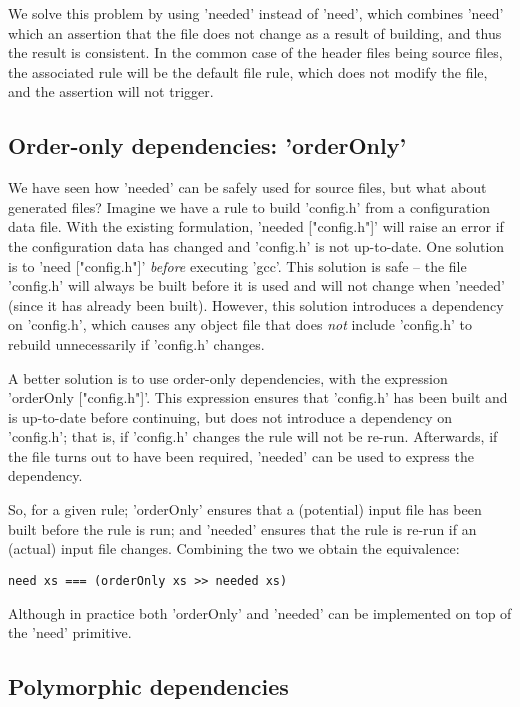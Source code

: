 We solve this problem by using \lst'needed' instead of \lst'need', which
combines \lst'need' which an assertion that the file does not change as a result
of building, and thus the result is consistent. In the common case of the header
files being source files, the associated rule will be the default file rule,
which does not modify the file, and the assertion will not trigger.

\subsection{Order-only dependencies: \lst'orderOnly'}

We have seen how \lst'needed' can be safely used for source files, but what
about generated files? Imagine we have a rule to build \lst'config.h' from a
configuration data file. With the existing formulation,
\lst'needed ["config.h"]' will raise an error if the configuration data has
changed and \lst'config.h' is not up-to-date. One solution is to \lst'need ["config.h"]'
\emph{before} executing \lst'gcc'. This solution is safe -- the file
\lst'config.h' will always be built before it is used and will not change when
\lst'needed' (since it has already been built). However, this solution
introduces a dependency on \lst'config.h', which causes any object file that
does \emph{not} include \lst'config.h' to rebuild unnecessarily if
\lst'config.h' changes.

A better solution is to use order-only dependencies, with the expression
\lst'orderOnly ["config.h"]'. This expression ensures that \lst'config.h' has
been built and is up-to-date before continuing, but does not introduce a
dependency on \lst'config.h'; that is, if \lst'config.h' changes
the rule will not be re-run. Afterwards, if the file turns out to have been
required, \lst'needed' can be used to express the dependency.

So, for a given rule; \lst'orderOnly' ensures that a (potential) input
file has been built before the rule is run; and \lst'needed' ensures
that the rule is re-run if an (actual) input file changes. Combining
the two we obtain the equivalence:

\begin{lstlisting}
need xs === (orderOnly xs >> needed xs)
\end{lstlisting}

\noindent Although in practice both \lst'orderOnly' and \lst'needed' can be
implemented on top of the \lst'need' primitive.

\subsection{Polymorphic dependencies\label{sec:polymorphic}}

